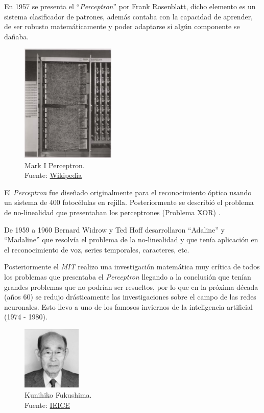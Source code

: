 En 1957 se presenta el ``\textit{Perceptron}'' por {Frank Rosenblatt}, dicho elemento es un sistema clasificador de patrones, además contaba con la capacidad de aprender, de ser robusto matemáticamente y poder adaptarse si algún componente se dañaba.

\begin{figure}[H]
    \centering
    \includegraphics[width=0.4\textwidth]{figures/perceptron.png}
    \caption{Mark I Perceptron.\\Fuente: \href{https://en.wikipedia.org/wiki/Perceptron}{Wikipedia}}
    \label{fig:perceptron}
\end{figure}

El \textit{Perceptron} fue diseñado originalmente para el reconocimiento óptico usando un sistema de 400 fotocélulas en rejilla.
Posteriormente se describió el problema de no-linealidad que presentaban los perceptrones (Problema XOR) \cite{cuevastello2018apuntes}.

De 1959 a 1960 {Bernard Widrow} y {Ted Hoff} desarrollaron ``Adaline'' y ``Madaline'' \cite{widrow1960adaptive} que resolvía el problema de la no-linealidad y que tenía aplicación en el reconocimiento de voz, series temporales, caracteres, etc.

Posteriormente el \textit{MIT} realizo una investigación matemática muy crítica de todos los problemas que presentaba el \textit{Perceptron} llegando a la conclusión que tenían grandes problemas que no podrían ser resueltos, por lo que en la próxima década (años 60) se redujo drásticamente las investigaciones sobre el campo de las redes neuronales.
Esto llevo a uno de los famosos inviernos de la inteligencia artificial (1974 - 1980).

\begin{figure}[H]
    \centering
    \includegraphics[width=0.25\textwidth]{figures/Kunihiko Fukushima.jpg}
    \caption{Kunihiko Fukushima.\\Fuente: \href{https://www.ieice.org/eng/about_ieice/new_honorary_members_award_winners/2017/meiyo_05e.html}{IEICE}}
    \label{fig:kunihiko-fukushima}
\end{figure}

